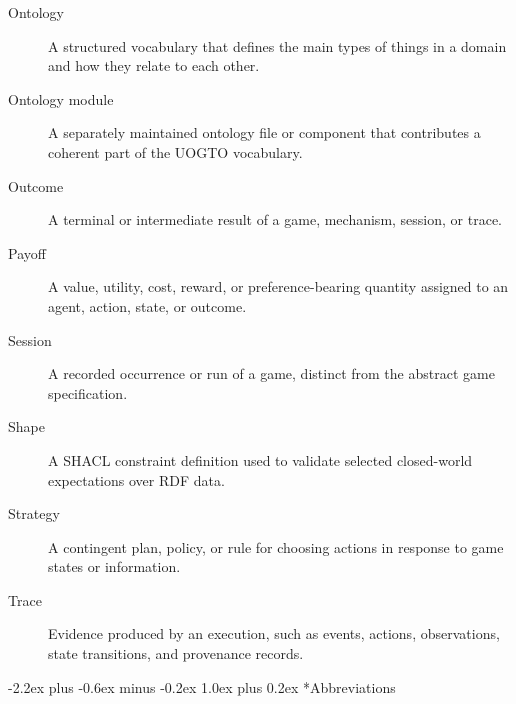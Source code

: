 \documentclass[11pt]{article}
\makeatletter
\renewcommand\section{\@startsection{section}{1}{\z@}%
  {-2.2ex plus -0.6ex minus -0.2ex}%
  {1.0ex plus 0.2ex}%
  {\normalfont\Large\bfseries\color{uogtoInk}}}
\makeatother
\begin{document}
\begin{description}
\item[\hypertarget{gloss:ontology}{Ontology}] A structured vocabulary that defines the main types of things in a domain and how they relate to each other.
\item[\hypertarget{gloss:ontology-module}{Ontology module}] A separately maintained ontology file or component that contributes a coherent part of the UOGTO vocabulary.
\item[\hypertarget{gloss:outcome}{Outcome}] A terminal or intermediate result of a game, mechanism, session, or trace.
\item[\hypertarget{gloss:payoff}{Payoff}] A value, utility, cost, reward, or preference-bearing quantity assigned to an agent, action, state, or outcome.
\item[\hypertarget{gloss:session}{Session}] A recorded occurrence or run of a game, distinct from the abstract game specification.
\item[\hypertarget{gloss:shape}{Shape}] A SHACL constraint definition used to validate selected closed-world expectations over RDF data.
\item[\hypertarget{gloss:strategy}{Strategy}] A contingent plan, policy, or rule for choosing actions in response to game states or information.
\item[\hypertarget{gloss:trace}{Trace}] Evidence produced by an execution, such as events, actions, observations, state transitions, and provenance records.
\end{description}

\clearpage
\section*{Abbreviations}
\end{document}
